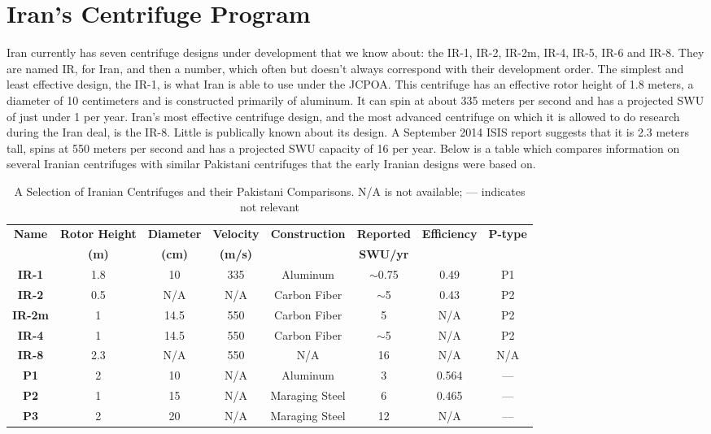 \section{Iran's Centrifuge Program}
\label{s_iran}

Iran currently has seven centrifuge designs under development that we know about: the IR-1, IR-2, IR-2m, IR-4, IR-5, IR-6 and IR-8. They are named IR, for Iran, and then a number, which often but doesn’t always correspond with their development order. The simplest and least effective design, the IR-1, is what Iran is able to use under the \gls{JCPOA}. This centrifuge has an effective rotor height of 1.8 meters, a diameter of 10 centimeters and is constructed primarily of aluminum. It can spin at about 335 meters per second and has a projected SWU of just under 1 per year. Iran’s most effective centrifuge design, and the most advanced centrifuge on which it is allowed to do research during the Iran deal, is the IR-8. Little is publically known about its design. A September 2014 \gls{ISIS} report suggests that it is 2.3 meters tall, spins at 550 meters per second and has a projected SWU capacity of 16 per year. Below is a table which compares information on several Iranian centrifuges with similar Pakistani centrifuges that the early Iranian designs were based on\cite{maccalman_2016,isis_website, glaser_?, tack_?,fars_?}.%

\begin{table}
\centering
\begin{tabular}{|c||c|c|c|c|c|c|c|}
\hline
\textbf{Name} & \textbf{Rotor Height} & \textbf{Diameter} & \textbf{Velocity} & \textbf{Construction} & \textbf{Reported} & \textbf{Efficiency} & \textbf{P-type} \\
     & \textbf{(m)}          &  \textbf{(cm)}    & \textbf{(m/s)}    &              & \textbf{SWU/yr}   &            &        \\
\hline
\textbf{IR-1}  & 1.8 & 10   & 335 & Aluminum       & $\sim$0.75 & 0.49  & P1 \\
\hline
\textbf{IR-2}  & 0.5 & N/A  & N/A & Carbon Fiber   & $\sim$5    & 0.43  & P2 \\
\hline
\textbf{IR-2m} & 1   & 14.5 & 550 & Carbon Fiber   & 5          & N/A   & P2 \\
\hline
\textbf{IR-4}  & 1   & 14.5 & 550 & Carbon Fiber   & $\sim$5    & N/A   & P2 \\
\hline
\textbf{IR-8}  & 2.3 & N/A  & 550 & N/A            & 16         & N/A   & N/A \\
\hline
\textbf{P1}    & 2   & 10   & N/A & Aluminum       & 3          & 0.564 & --- \\
\hline
\textbf{P2}    & 1   & 15   & N/A & Maraging Steel & 6          & 0.465 & --- \\
\hline
\textbf{P3}    & 2   & 20   & N/A & Maraging Steel & 12         & N/A   & --- \\
\hline
\end{tabular}
\caption{A Selection of Iranian Centrifuges and their Pakistani Comparisons. N/A is not available; --- indicates not relevant}
\label{tab:factor_sources}
\end{table}

